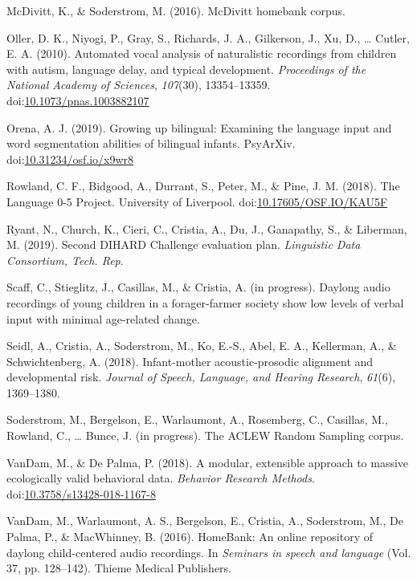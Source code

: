 \documentclass[english,floatsintext,man]{apa6}
\begin{document}
\hypertarget{ref-mcdivitt2016mcdivitt}{}
McDivitt, K., \& Soderstrom, M. (2016). McDivitt homebank corpus.

\hypertarget{ref-Oller}{}
Oller, D. K., Niyogi, P., Gray, S., Richards, J. A., Gilkerson, J., Xu,
D., \ldots{} Cutler, E. A. (2010). Automated vocal analysis of
naturalistic recordings from children with autism, language delay, and
typical development. \emph{Proceedings of the National Academy of
Sciences}, \emph{107}(30), 13354--13359.
doi:\href{https://doi.org/10.1073/pnas.1003882107}{10.1073/pnas.1003882107}

\hypertarget{ref-orena_2019}{}
Orena, A. J. (2019). Growing up bilingual: Examining the language input
and word segmentation abilities of bilingual infants. PsyArXiv.
doi:\href{https://doi.org/10.31234/osf.io/x9wr8}{10.31234/osf.io/x9wr8}

\hypertarget{ref-rowland2018}{}
Rowland, C. F., Bidgood, A., Durrant, S., Peter, M., \& Pine, J. M.
(2018). The Language 0-5 Project. University of Liverpool.
doi:\href{https://doi.org/10.17605/OSF.IO/KAU5F}{10.17605/OSF.IO/KAU5F}

\hypertarget{ref-ryant2019second}{}
Ryant, N., Church, K., Cieri, C., Cristia, A., Du, J., Ganapathy, S., \&
Liberman, M. (2019). Second DIHARD Challenge evaluation plan.
\emph{Linguistic Data Consortium, Tech. Rep}.

\hypertarget{ref-scaff}{}
Scaff, C., Stieglitz, J., Casillas, M., \& Cristia, A. (in progress).
Daylong audio recordings of young children in a forager-farmer society
show low levels of verbal input with minimal age-related change.

\hypertarget{ref-Seidl2018}{}
Seidl, A., Cristia, A., Soderstrom, M., Ko, E.-S., Abel, E. A.,
Kellerman, A., \& Schwichtenberg, A. (2018). Infant-mother
acoustic-prosodic alignment and developmental risk. \emph{Journal of
Speech, Language, and Hearing Research}, \emph{61}(6), 1369--1380.

\hypertarget{ref-soderstrom}{}
Soderstrom, M., Bergelson, E., Warlaumont, A., Rosemberg, C., Casillas,
M., Rowland, C., \ldots{} Bunce, J. (in progress). The ACLEW Random
Sampling corpus.

\hypertarget{ref-VanDam2018}{}
VanDam, M., \& De Palma, P. (2018). A modular, extensible approach to
massive ecologically valid behavioral data. \emph{Behavior Research
Methods}.
doi:\href{https://doi.org/10.3758/s13428-018-1167-8}{10.3758/s13428-018-1167-8}

\hypertarget{ref-vandam2016homebank}{}
VanDam, M., Warlaumont, A. S., Bergelson, E., Cristia, A., Soderstrom,
M., De Palma, P., \& MacWhinney, B. (2016). HomeBank: An online
repository of daylong child-centered audio recordings. In \emph{Seminars
in speech and language} (Vol. 37, pp. 128--142). Thieme Medical
Publishers.
\end{document}

